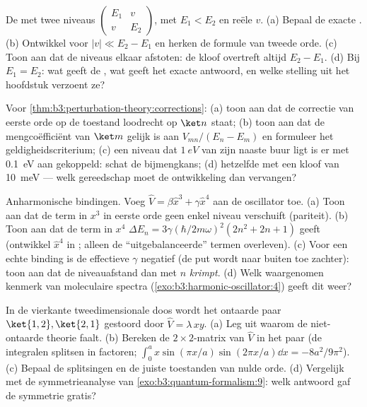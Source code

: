 \begin{exercise}[$\star$]\label{exo:b3:perturbation-theory:3}
De  met twee niveaus $\begin{pmatrix}E_1 & v\\ v &
E_2\end{pmatrix}$, met $E_1 < E_2$ en reële $v$. (a) Bepaal de exacte
. (b) Ontwikkel voor $|v| \ll E_2 - E_1$ en herken de formule
van tweede orde. (c) Toon aan dat de niveaus elkaar afstoten: de kloof
overtreft altijd $E_2 - E_1$. (d) Bij $E_1 = E_2$: wat geeft de
, wat geeft het exacte antwoord, en welke stelling uit het
hoofdstuk verzoent ze?
\end{exercise}

\begin{exercise}[$\star$]\label{exo:b3:perturbation-theory:4}
Voor \cref{thm:b3:perturbation-theory:corrections}: (a) toon aan dat de
correctie van eerste orde op de toestand loodrecht op $\ket n$ staat; (b)
toon aan dat de mengcoëfficiënt van $\ket m$ gelijk is aan $V_{mn}/(E_n - E_m)$ en formuleer het geldigheidscriterium; (c) een niveau dat
$\qty{1}{eV}$ van zijn naaste buur ligt is er met \qty{0.1}{eV} aan
gekoppeld: schat de bijmengkans; (d) hetzelfde met een kloof van
\qty{10}{meV} --- welk gereedschap moet de ontwikkeling dan vervangen?
\end{exercise}

\begin{exercise}[$\star\star$]\label{exo:b3:perturbation-theory:5}
Anharmonische bindingen. Voeg $\hat V = \beta\hat x^3 + \gamma\hat x^4$
aan de oscillator toe. (a) Toon aan dat de term in $x^3$ in eerste orde
geen enkel niveau verschuift (pariteit). (b) Toon aan dat de term in $x^4$
$\Delta E_n =
3\gamma(\hbar/2m\omega)^2(2n^2 + 2n + 1)$ geeft (ontwikkel
$\hat x^4$ in ; alleen de ``uitgebalanceerde'' termen
overleven). (c) Voor een echte binding is de effectieve $\gamma$ negatief (de put wordt naar
buiten toe zachter): toon aan dat de niveauafstand dan met $n$
\emph{krimpt}.
(d) Welk waargenomen kenmerk van moleculaire spectra
(\cref{exo:b3:harmonic-oscillator:4}) geeft dit weer?
\end{exercise}

\begin{exercise}[$\star\star$]\label{exo:b3:perturbation-theory:6}
In de vierkante tweedimensionale doos wordt het ontaarde paar $\ket{1,2},
\ket{2,1}$ gestoord door $\hat V = \lambda\,xy$. (a) Leg uit waarom de
niet-ontaarde theorie faalt. (b) Bereken de $2\times2$-matrix van $\hat V$
in het paar (de integralen splitsen in factoren; $\int_0^a
x\sin(\pi x/a)\sin(2\pi x/a)\dd x = -8a^2/9\pi^2$). (c) Bepaal de
splitsingen en de juiste toestanden van nulde orde. (d) Vergelijk met de
symmetrieanalyse van \cref{exo:b3:quantum-formalism:9}: welk antwoord gaf
de symmetrie gratis?
\end{exercise}

